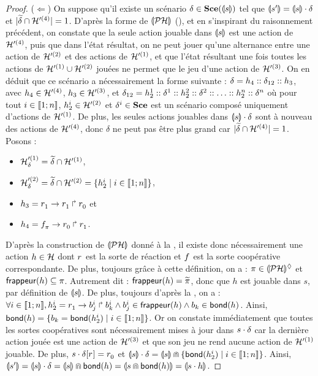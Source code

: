 \begin{proof}
  ($\Leftarrow$) On suppose qu'il existe un scénario $\delta \in \Sce(\tophp{s})$
    tel que $\tophp{s'} = \tophp{s} \play \delta$ et $\card{\toset{\delta} \cap \PHh'^{(4)}} = 1$.
    D'après la forme de $\phmtophp$ (),
    et en s'inspirant du raisonnement précédent,
    on constate que la seule action jouable dans $\tophp{s}$ est une action de $\PHh'^{(4)}$,
    puis que dans l'état résultat, on ne peut jouer
    qu'une alternance entre une action de $\PHh'^{(2)}$ et des actions de $\PHh'^{(1)}$,
    et que l'état résultant une fois toutes les actions de $\PHh'^{(1)} \cup \PHh'^{(2)}$
    jouées ne permet que le jeu d'une action de $\PHh'^{(3)}$.
    On en déduit que ce scénario a nécessairement la forme suivante :
    $\delta = h_4 \cons \delta_{12} \cons h_3$,
    avec $h_4 \in \PHh'^{(4)}$, $h_3 \in \PHh'^{(3)}$, et
    $\delta_{12} = h_2^1 \cons \delta^1 \cons h_2^2 \cons \delta^2 \cons
      \ldots \cons h_2^n \cons \delta^n$
    où pour tout $i \in \segm{1}{n}$, $h_2^i \in \PHh'^{(2)}$
    et $\delta^i \in \Sce$ est un scénario composé uniquement d'actions de $\PHh'^{(1)}$.
    De plus, les seules actions jouables dans $\tophp{s} \play \delta$ sont à nouveau des actions
    de $\PHh'^{(4)}$, donc $\delta$ ne peut pas être plus grand car
    $\card{\toset{\delta} \cap \PHh'^{(4)}} = 1$.
    Posons :
    \begin{itemize}
      \item $\PHh'^{(1)}_\delta = \toset{\delta} \cap \PHh'^{(1)}$,
      \item $\PHh'^{(2)}_\delta = \toset{\delta} \cap \PHh'^{(2)}
        = \{ h_2^i \mid i \in \segm{1}{n} \}$,
      \item $h_3 = \PHhit{\sr{}_1}{\sr{}_1}{\sr{}_0}$ et
      \item $h_4 = \PHhit{\scf{}_\mypi}{\sr{}_0}{\sr{}_1}$.
    \end{itemize}
    D'après la construction de $\phmtophp$ donné à la ,
    il existe donc nécessairement une action $h \in \PHh$
    dont $\sr{}$ est la sorte de réaction et $\scf{}$ est la sorte coopérative correspondante.
    De plus, toujours grâce à cette définition, on a :
    $\mypi \in \PHsubl[\phmtophp]$ et $\frappeur{h} \subseteq \mypi$.
    Autrement dit : $\frappeur{h} = \toset{\mypi}$,
    donc que $h$ est jouable dans $s$, par définition de $\tophp{s}$.
    De plus, toujours d'après la , on a :
    $\forall i \in \segm{1}{n}, h_2^i = \PHfrappe{\sr{}_1}{b_j^i}{b_k^i}
      \wedge b_j^i \in \frappeur{h} \wedge b_k \in \bond{h}$.
    Ainsi, $\bond{h} = \{ b_k = \bond{h_2^i} \mid i \in \segm{1}{n} \}$.
    Or on constate immédiatement que toutes les sortes coopératives sont nécessairement
    mises à jour
    dans $s \play \delta$ car la dernière action jouée est une action de $\PHh'^{(3)}$
    et que son jeu ne rend aucune action de $\PHh'^{(1)}$ jouable.
    De plus, $\PHget{s \play \delta}{\sr{}} = \sr{}_0$ et
    $\tophp{s} \play \delta = \tophp{s} \recouvre \{ \bond{h_2^i} \mid i \in \segm{1}{n} \}$.
    Ainsi, $\tophp{s'} = \tophp{s} \play \delta = \tophp{s} \recouvre \bond{h}
      = \tophp{s \recouvre \bond{h}} = \tophp{s \play h}$.
\end{proof}



